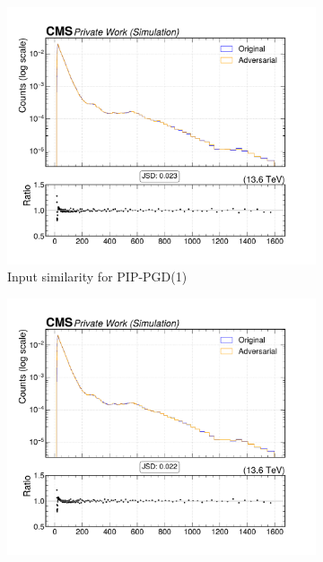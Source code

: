 \begin{figure}[htbp]
  \centering
  \begin{subfigure}[t]{0.32\textwidth}
    \includegraphics[width=\linewidth]{media/output/features/compare/combined_it_1/cmp_global_features_jet_pt.pdf}
    \caption*{Input similarity for PIP-PGD(1)}
  \end{subfigure}\hfill
  \begin{subfigure}[t]{0.32\textwidth}
    \includegraphics[width=\linewidth]{media/output/features/compare/combined_it_2/cmp_global_features_jet_pt.pdf}

\end{subfigure}
\end{figure}
